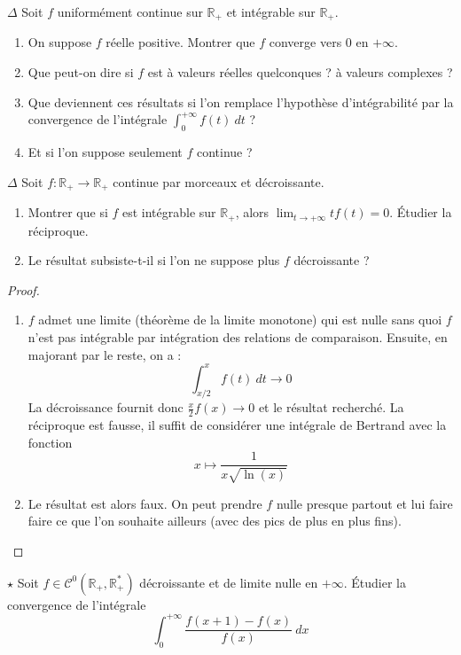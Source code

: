 \documentclass[french,a4paper]{article}
\newcommand{\R}{\mathbb{R}}
\newcommand{\st}{^*}
\theoremstyle{plain}
\theoremstyle{definition}
\theoremstyle{remark}
\begin{document}
\begin{ex}[Moulin.IG.39]{$\Delta$}
	Soit $f$ uniformément continue sur $\R_+$ et intégrable sur $\R_+$.
	\begin{enumerate}
		\item On suppose $f$ réelle positive. Montrer que $f$ converge vers $0$ en $+\infty$.
		\item Que peut-on dire si $f$ est à valeurs réelles quelconques ? à valeurs complexes ?
		\item Que deviennent ces résultats si l'on remplace l'hypothèse d'intégrabilité par la convergence de l'intégrale $\displaystyle\int_{0}^{+\infty}f(t)\ dt$ ?
		\item Et si l'on suppose seulement $f$ continue ? 
	\end{enumerate}
\end{ex}

\begin{ex}[Moulin.IG.40]{$\Delta$}
	Soit $f:\R_+\to\R_+$ continue par morceaux et décroissante.
	\begin{enumerate}
		\item Montrer que si $f$ est intégrable sur $\R_+$, alors $\lim_{t\to+\infty}tf(t)=0$. Étudier la réciproque.
		\item Le résultat subsiste-t-il si l'on ne suppose plus $f$ décroissante ? 
	\end{enumerate}
\end{ex}
\begin{proof}
	\begin{enumerate}
		\item $f$ admet une limite (théorème de la limite monotone) qui est nulle sans quoi $f$ n'est pas intégrable par intégration des relations de comparaison. Ensuite, en majorant par le reste, on a : $$\int_{x/2}^{x}f(t)\ dt\to 0$$ La décroissance fournit donc $\displaystyle\frac{x}{2}f(x)\to 0$ et le résultat recherché. La réciproque est fausse, il suffit de considérer une intégrale de Bertrand avec la fonction $$x\mapsto\frac{1}{x\sqrt{\ln(x)}}$$
		\item Le résultat est alors faux. On peut prendre $f$ nulle presque partout et lui faire faire ce que l'on souhaite ailleurs (avec des pics de plus en plus fins).
	\end{enumerate}
\end{proof}

\begin{ex}[Moulin.IG.41]{$\star$}
	Soit $f\in\mathcal{C}^0(\R_+,\R_+\st)$ décroissante et de limite nulle en $+\infty$. Étudier la convergence de l'intégrale $$\int_{0}^{+\infty}\frac{f(x+1)-f(x)}{f(x)}\ dx$$
\end{ex}
\end{document}
